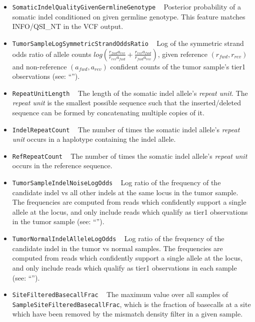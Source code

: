 \documentclass{article}
\begin{document}
\begin{itemize}
    \item \texttt{SomaticIndelQualityGivenGermlineGenotype} ~ Posterior probability of a somatic indel conditioned on given germline genotype. This feature matches INFO/QSI\_NT in the VCF output.

    \item \texttt{TumorSampleLogSymmetricStrandOddsRatio} ~ Log of the symmetric strand odds ratio of allele counts $log{\left( \frac{r_{fwd} a_{rev}} {r_{rev} a_{fwd}} + \frac{r_{rev} a_{fwd}} {r_{fwd} a_{rev}}\right)}$, given reference $(r_{fwd},r_{rev})$ and non-reference $(a_{fwd},a_{rev})$ confident counts of the tumor sample's tier1 observations (see: ``'').

    \item \texttt{RepeatUnitLength} ~ The length of the somatic indel allele's \emph{repeat unit}. The \emph{repeat unit} is the smallest possible sequence such that the inserted/deleted sequence can be formed by concatenating multiple copies of it.

    \item \texttt{IndelRepeatCount} ~ The number of times the somatic indel allele's \emph{repeat unit} occurs in a haplotype containing the indel allele.

    \item \texttt{RefRepeatCount} ~ The number of times the somatic indel allele's \emph{repeat unit} occurs in the reference sequence.

    \item \texttt{TumorSampleIndelNoiseLogOdds} ~ Log ratio of the frequency of the candidate indel vs all other indels at the same locus in the tumor sample. The frequencies are computed from reads which confidently support a single allele at the locus, and only include reads which qualify as tier1 observations in the tumor sample (see: ``'').

    \item \texttt{TumorNormalIndelAlleleLogOdds} ~ Log ratio of the frequency of the candidate indel in the tumor vs normal samples. The frequencies are computed from reads which confidently support a single allele at the locus, and only include reads which qualify as tier1 observations in each sample (see: ``'').

    \item \texttt{SiteFilteredBasecallFrac} ~ The maximum value over all samples of \texttt{SampleSiteFilteredBasecallFrac}, which is the fraction of basecalls at a site which have been removed by the mismatch density filter in a given sample.


\end{itemize}
\end{document}
